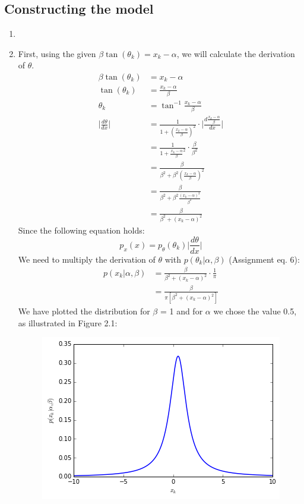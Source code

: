 \documentclass[a4paper,10pt]{article}
\numberwithin{equation}{section} %
\numberwithin{figure}{section} %
\numberwithin{table}{section} %
\theoremstyle{mytheor}
\begin{document}
\subsection{Constructing the model}
\begin{enumerate}
	\item 
	\item First, using the given $\beta \tan (\theta_k) = x_k - \alpha$, we will calculate the derivation of $\theta$.
		\begin{align}
		\beta \tan (\theta_k) &= x_k - \alpha \tag{Assignment eq. 7}\\
		\tan (\theta_k) &= \frac{x_k - \alpha}{\beta} \\
		\theta_k &= \tan^{-1} \frac{x_k - \alpha}{\beta} \\
		\bigg \vert \frac{d\theta}{dx} \bigg \vert &= \frac{1}{1 + (\frac{x_k - \alpha}{\beta})^2} \cdot \bigg \vert \frac{d\frac{x_k - \alpha}{\beta}}{dx} \bigg \vert\\
		&= \frac{1}{1 + \frac{x_k - \alpha}{\beta}^2} \cdot \frac{\beta}{\beta^2}\\
		&= \frac{\beta}{\beta^2 + \beta^2(\frac{x_k - \alpha}{\beta})^2}\\
		&= \frac{\beta}{\beta^2 + \beta^2\frac{(x_k - \alpha)^2}{\beta^2}}\\
		& = \frac{\beta}{\beta^2 + (x_k - \alpha)^2}
		\end{align}
		Since the following equation holds:
		\begin{equation}
		p_x(x) = p_{\theta}(\theta_k)\bigg \vert \frac{d\theta}{dx} \bigg \vert \tag{Bishop 1.27}
		\end{equation}
		We need to multiply the derivation of $\theta$ with $p(\theta_k | \alpha, \beta)$ (Assignment eq. 6):
		\begin{align}
		p(x_k | \alpha, \beta) &= \frac{\beta}{\beta^2 + (x_k - \alpha)^2} \cdot \frac{1}{\pi}\\
		&= \frac{\beta}{\pi [\beta^2 + (x_k - \alpha)^2]} \tag{Assignment eq. 8}
		\end{align}
		We have plotted the distribution for $\beta$ = 1 and for $\alpha$ we chose the value 0.5, as illustrated in Figure 2.1: \begin{figure}[h!]
   			\centering
   			\includegraphics{distr.png}\vspace{-0.2cm}

\end{figure}
\end{enumerate}
\end{document}
